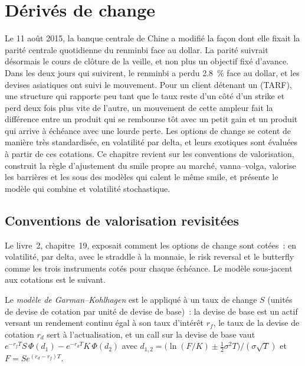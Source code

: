 \chapter{Dérivés de change}\label{ch:dv:fx-derivatives}

Le 11 août 2015, la banque centrale de Chine a modifié la façon dont elle fixait la parité centrale quotidienne du renminbi face au dollar.
La parité suivrait désormais le cours de clôture de la veille, et non plus un objectif fixé d'avance. Dans les deux jours qui
suivirent, le renminbi a perdu 2.8~\% face au dollar, et les devises asiatiques ont suivi le mouvement. Pour un client détenant un
 (TARF), une structure qui rapporte peu tant que le taux reste d'un côté d'un strike et perd deux fois
plus vite de l'autre, un mouvement de cette ampleur fait la différence entre un produit qui se rembourse tôt avec un petit gain et un
produit qui arrive à échéance avec une lourde perte. Les options de change se cotent de manière très standardisée, en volatilité par delta, et leurs exotiques sont
évaluées à partir de ces cotations. Ce chapitre revient sur les conventions de valorisation, construit la
règle d'ajustement du smile propre au marché, vanna--volga, valorise les barrières et les  sous des modèles qui calent
le même smile, et présente le modèle qui combine  et volatilité stochastique.

\section{Conventions de valorisation revisitées}

Le livre~2, chapitre~19, exposait comment les options de change sont cotées~: en volatilité, par delta, avec le
straddle à la monnaie, le risk reversal et le butterfly comme les trois instruments cotés pour chaque échéance. Le modèle sous-jacent aux
cotations est le suivant.

\begin{definition}\label{def:dv:fx-derivatives:gk}
Le \emph{modèle de Garman--Kohlhagen} est le  appliqué à un taux de change $S$ (unités de devise de cotation
par unité de devise de base)~: la devise de base est un actif versant un rendement continu égal à son taux d'intérêt $r_f$,
le taux de la devise de cotation $r_d$ sert à l'actualisation, et un call sur la devise de base vaut
$e^{-r_fT}S\,\Phi(d_1)-e^{-r_dT}K\,\Phi(d_2)$ avec $d_{1,2}=\bigl(\ln(F/K)\pm\frac12\sigma^2T\bigr)/(\sigma\sqrt T)$ et
$F=Se^{(r_d-r_f)T}$.
\end{definition}

